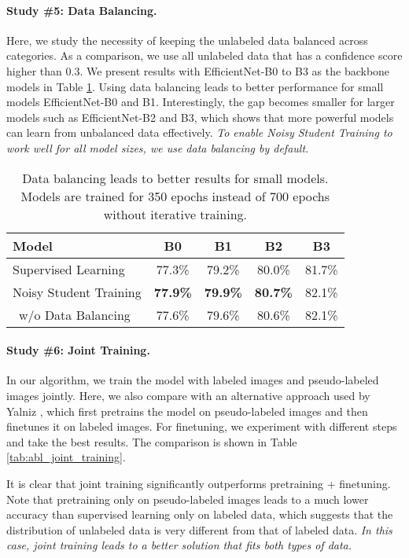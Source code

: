 \documentclass[10pt,twocolumn,letterpaper]{article}
\begin{document}
\paragraph{Study \#5: Data Balancing.}
Here, we study the necessity of keeping the unlabeled data balanced across categories. As a comparison, we use all unlabeled data that has a confidence score higher than 0.3.  We present results with EfficientNet-B0 to B3 as the backbone models in Table \ref{tab:abl_data_balancing}. Using data balancing leads to better performance for small models EfficientNet-B0 and B1. Interestingly, the gap becomes smaller for larger models such as EfficientNet-B2 and B3, which shows that more powerful models can learn from unbalanced data effectively. 
\emph{To enable Noisy Student Training to work well for all model sizes, we use data balancing by default.}
\begin{table}[h!]
\footnotesize
    \centering
        \begin{tabular}{l|cccc}
        \toprule 
        Model &  B0 & B1 & B2 & B3  \\
        \midrule      
	    Supervised Learning  & 77.3\% & 79.2\% & 80.0\% & 81.7\% \\
	    \midrule
		Noisy Student Training & \bf 77.9\% & \bf 79.9\% & \bf 80.7\% & 82.1\% \\
		\  w/o Data Balancing &  77.6\% & 79.6\% & 80.6\% &  82.1\% \\
        \bottomrule
        \end{tabular}
    \caption{Data balancing leads to better results for small models. Models are trained for 350 epochs instead of 700 epochs without iterative training.}
    \label{tab:abl_data_balancing}
\end{table}

\paragraph{Study \#6: Joint Training.} 
In our algorithm, we train the model with labeled images and pseudo-labeled images jointly. Here, we also compare with an alternative approach used by Yalniz \etal \cite{billion_large_scale}, which first pretrains the model on pseudo-labeled images and then finetunes it on labeled images. For finetuning, we experiment with different steps and take the best results. The comparison is shown in Table \ref{tab:abl_joint_training}. 

It is clear that joint training significantly outperforms pretraining + finetuning. 
Note that pretraining only on pseudo-labeled images leads to a much lower accuracy than supervised learning only on labeled data, which suggests that the distribution of unlabeled data is very different from that of labeled data. \emph{In this case, joint training leads to a better solution that fits both types of data.}
\end{document}
